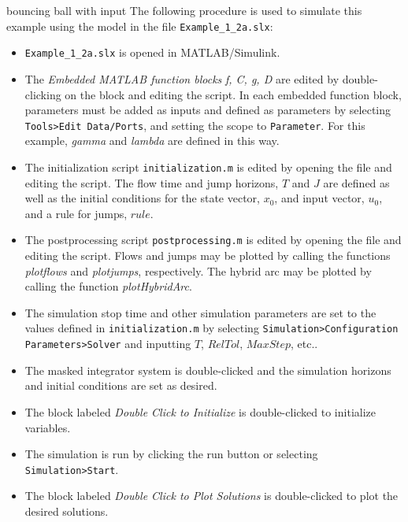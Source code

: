 \begin{example}{bouncing ball with input}
\noindent The following procedure is used to simulate this example using the model in the file {\tt Example\_1\_2a.slx}:
\begin{itemize}
\item {\tt Example\_1\_2a.slx} is opened in MATLAB/Simulink.
\item The {\em Embedded MATLAB function blocks} {\em f, C, g, D} are edited by double-clicking on the block and editing the script. In each embedded function block, parameters must be added as inputs and defined as parameters by selecting {\tt Tools>Edit Data/Ports}, and setting the scope to {\tt Parameter}. For this example, {\em gamma} and {\em lambda} are defined in this way.
\item The initialization script {\tt initialization.m} is edited by opening the file and editing the script. The flow time and jump horizons, $T$ and $J$ are defined as well as the initial conditions for the state vector, $x_0$, and input vector, $u_0$, and a rule for jumps, $rule$.
\item The postprocessing script {\tt postprocessing.m} is edited by opening the file and editing the script. Flows and jumps may be plotted by calling the functions {\em plotflows} and {\em plotjumps}, respectively. The hybrid arc may be plotted by calling the function {\em plotHybridArc}.
\item The simulation stop time and other simulation parameters are set to the values defined in {\tt initialization.m} by selecting {\tt Simulation>Configuration Parameters>Solver} and inputting $T$, $RelTol$, $MaxStep$, etc..
\item The masked integrator system is double-clicked and the simulation horizons and initial conditions are set as desired.
\item The block labeled {\em Double Click to Initialize} is double-clicked to initialize variables.
\item The simulation is run by clicking the run button or selecting {\tt Simulation>Start}.
\item The block labeled {\em Double Click to Plot Solutions} is double-clicked to plot the desired solutions.
\end{itemize}

%


\end{example}
